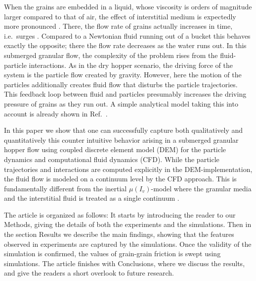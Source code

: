 \documentclass[twoside,twocolumn,9pt]{article}
\begin{document}
When the grains are embedded in a liquid, whose viscosity is orders of magnitude larger compared to that of air,
the effect of interstitial medium is expectedly more pronounced \cite{koivistoSubmitted}. There, the flow rate of grains actually increases in time, i.e.~surges \cite{Wilson2014}. Compared to a Newtonian fluid running out of a bucket this behaves exactly the opposite; there the flow rate decreases as the water runs out. In this submerged granular flow, the complexity of the problem rises from the fluid-particle interactions. As in the dry hopper scenario, the driving force of the system is the particle flow created by gravity. However, here the motion of the particles additionally creates fluid flow that disturbs the particle trajectories. This feedback loop between fluid and particles presumably increases the driving pressure of grains as they run out. A simple analytical model taking this into account is already shown in Ref.~\cite{koivistoSubmitted}.



In this paper we show that one can successfully capture both qualitatively and quantitatively this counter intuitive behavior arising in a submerged granular hopper flow using coupled discrete element model (DEM) for the particle dynamics and computational fluid dynamics (CFD). While the particle trajectories and interactions are computed explicitly in the DEM-implementation, the fluid flow is modeled on a continuum level by the CFD approach. This is fundamentally different from the inertial $\mu(I_v)$-model where the granular media and the interstitial fluid is treated as a single continuum \cite{Boyer11PRL}.

The article is organized as follows: It starts by introducing the reader to our Methods, giving the details of both the experiments and the simulations. Then in the section Results we describe the main findings, showing that the features observed in experiments are captured by the simulations. Once the validity of the simulation is confirmed, the values of grain-grain friction is swept using simulations.
The article finishes with Conclusions, where we discuss the results, and give the readers a short overlook to future research.
 
\end{document}
